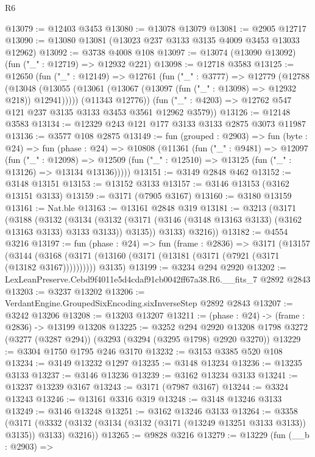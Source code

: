 \begin{lexlean}{R6}
\begin{coremodule}
@13079 := @12403 @3453
@13080 := @13078 @13079
@13081 := @2905 @12717
@13090 := @13080 @13081 (@13023 @237 @3133 @3135 @4009 @3453 @13033 @12962)
@13092 := @3738 @4008 @108
@13097 := @13074 (@13090 @13092) (fun ("_" : @12719) => @12932 @221)
@13098 := @12718 @3583
@13125 := @12650
    (fun ("_" : @12149) =>
    @12761
      (fun ("_" : @3777) =>
      @12779
        (@12788
          (@13048 (@13055 (@13061 (@13067 (@13097 (fun ("_" : @13098) => @12932 @218)) @12941)))))
        (@11343 @12776))
      (fun ("_" : @4203) => @12762 @547 @121 @237 @3135 @3133 @3453 @3561 @12962 @3579))
@13126 := @12148 @3583
@13134 := @12329 @243 @121 @177 @3133 @3133 @2875 @3073 @11987
@13136 := @3577 @108 @2875
@13149 := fun (grouped : @2903) =>
  fun (byte : @24) =>
  fun (phase : @24) =>
  @10808
    (@11361
      (fun ("_" : @9481) =>
      @12097
        (fun ("_" : @12098) =>
        @12509 (fun ("_" : @12510) => @13125 (fun ("_" : @13126) => @13134 @13136)))))
@13151 := @3149 @2848 @462
@13152 := @3148 @13151
@13153 := @13152 @3133
@13157 := @3146 @13153 (@3162 @13151 @3133)
@13159 := @3171 (@7905 @3167)
@13160 := @3180 @13159
@13161 := Nat.ble
@13163 := @13161 @2848 @319
@13181 := @3213
    (@3171
      (@3188
        (@3132
          (@3134
            (@3132 (@3171 (@3146 (@3148 @13163 @3133) (@3162 @13163 @3133) @3133 @3133)) @3135))
          @3133)
        @3216))
@13182 := @4554 @3216
@13197 := fun (phase : @24) =>
  fun (frame : @2836) =>
  @3171
    (@13157
      (@3144 (@3168 (@3171 (@13160 (@3171 (@13181 (@3171 (@7921 (@3171 (@13182 @3167))))))))))
      @3135)
@13199 := @3234 @294 @2920
@13202 := LexLeanPreserve.Cebd9f4011e5d4cdaf91cb0042ff67a38.R6.__fits_7 @2892 @2843
@13203 := @3237 @13202
@13206 := VerdantEngine.GroupedSixEncoding.sixInverseStep @2892 @2843
@13207 := @3242 @13206
@13208 := @13203 @13207
@13211 := (phase : @24) -> (frame : @2836) -> @13199 @13208
@13225 := @3252
    @294
    @2920
    @13208
    @1798
    @3272
    (@3277 (@3287 @294))
    (@3293 (@3294 (@3295 @1798) @2920 @3270))
@13229 := @3304 @1750 @1795 @246 @3170
@13232 := @3153 @3385 @520 @108
@13234 := @3149 @13232 @1297
@13235 := @3148 @13234
@13236 := @13235 @3133
@13237 := @3146 @13236
@13239 := @3162 @13234 @3133
@13241 := @13237 @13239 @3167
@13243 := @3171 (@7987 @3167)
@13244 := @3324 @13243
@13246 := @13161 @3316 @319
@13248 := @3148 @13246 @3133
@13249 := @3146 @13248
@13251 := @3162 @13246 @3133
@13264 := @3358
    (@3171 (@3332 (@3132 (@3134 (@3132 (@3171 (@13249 @13251 @3133 @3133)) @3135)) @3133) @3216))
@13265 := @9828 @3216
@13279 := @13229
    (fun (__b : @2903) =>

\end{coremodule}
\end{lexlean}
